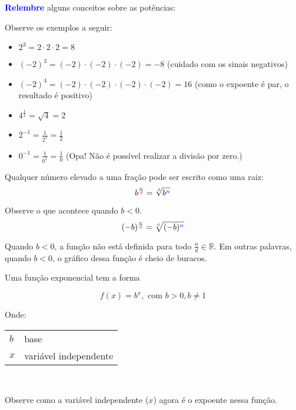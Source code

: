 \documentclass[12pt,openright,twoside,a4paper]{article}
\makeatletter
\theoremstyle{definition}
\newenvironment{condicoes}[1][Onde:]
{#1 \begin{tabular}[t]{>{$}l<{$} @{${} \implies {}$} l}}
	{\end{tabular}\\[\belowdisplayskip]}
\makeatother
\begin{document}
	\begin{snugshade}
		\textbf{\textcolor{blue}{Relembre}} alguns conceitos sobre as potências:
		
		Observe os exemplos a seguir:
		
		\begin{itemize}
			\item $2^3 = 2 \cdot 2 \cdot 2 = 8$
			\item $(-2)^3 = (-2) \cdot (-2) \cdot (-2) = -8$ (cuidado com os sinais negativos)
			\item $(-2)^4 = (-2) \cdot (-2) \cdot (-2) \cdot (-2) = 16$ (como o expoente é par, o resultado é positivo)
			\item $4^\frac{1}{2} = \sqrt{4} = 2$ 
			\item $\displaystyle 2^{-1} = \frac{1}{2^1} = \frac{1}{2}$
			\item $\displaystyle 0^{-1} = \frac{1}{0^1} = \frac{1}{0}$ (Opa! Não é possível realizar a divisão por zero.)
		\end{itemize}
		
		
		Qualquer número elevado a uma fração pode ser escrito como uma raiz:
		\begin{equation*}
			b^{\frac{{\textcolor{blue}{n}}}{{\textcolor{red}{d}}}} = \sqrt[{\textcolor{red}{d}}]{b^{\textcolor{blue}{n}}}
		\end{equation*}
		
		Observe o que acontece quando $b<0$.
		\begin{equation*}
			(-b)^{\frac{{\textcolor{blue}{n}}}{{\textcolor{red}{d}}}} = \sqrt[{\textcolor{red}{d}}]{(-b)^{\textcolor{blue}{n}}}
		\end{equation*}
		
		Quando $b<0$, a função não está definida para todo $\frac{n}{d} \in \mathbb{R}$. Em outras palavras, quando $b<0$, o gráfico dessa função é cheio de buracos.
	\end{snugshade}
	
	Uma função exponencial tem a forma
	
	\begin{equation}
		f(x) = b^x, \text{ com } b > 0, b \neq 1 
	\end{equation}
	
	\begin{condicoes}
		b & base\\
		x & variável independente
	\end{condicoes}
	
	Observe como a variável independente ($x$) agora é o expoente nessa função.
	
\end{document}
